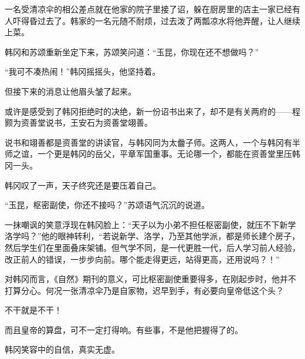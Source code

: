一名受清凉伞的相公差点就在他家的院子里接了诏，躲在厨房里的店主一家已经有人吓得昏过去了。韩家的一名元随不耐烦，过去泼了两瓢凉水将他弄醒，让人继续上菜。

韩冈和苏颂重新坐定下来，苏颂笑问道：“玉昆，你现在还不想做吗？”

“我可不凑热闹！”韩冈摇摇头，他坚持着。

但接下来的消息让他眉头皱了起来。

或许是感受到了韩冈拒绝时的决绝，新一份诏书出来了，却不是有关两府的——程颢为资善堂说书，王安石为资善堂翊善。

说书和翊善都是资善堂的讲读官，与韩冈同为太齤子师。这两人，一个与韩冈有半师之谊，一个更是韩冈的岳父，平章军国重事。无论哪一个，都能在资善堂里压韩冈一头。

韩冈叹了一声，天子终究还是要压着自己。

“玉昆，枢密副使，你还不接吗？”苏颂语气沉沉的说道。

一抹嘲讽的笑意浮现在韩冈脸上：“天子以为小弟不担任枢密副使，就压不下新学洛学吗？”他的眼神转利，“若说新学、洛学，乃至其他学派，都是师长建个房子，然后学生们在里面叠床架铺。但气学不同，是一代更胜一代，后人学习前人经验，改正前人的错误，一步步向前。哪个能走得更远，站得更高，还用说吗？！”

对韩冈而言，《自然》期刊的意义，可比枢密副使重要得多，在刚起步时，他并不打算分心。何况一张清凉伞乃是自家物，迟早到手，有必要向皇帝低这个头？

不干就是不干！

而且皇帝的算盘，可不一定打得响。有些事，不是他把握得了的。

韩冈笑容中的自信，真实无虚。
